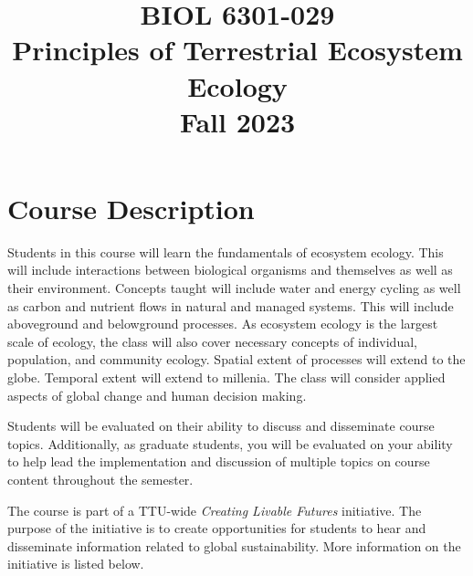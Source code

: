 \documentclass[12pt, notitlepage]{article}   	%
\title{
	\textbf{
		BIOL 6301-029
	} \\
	\large Principles of Terrestrial Ecosystem Ecology \\
	\large Fall 2023
}
\date{\vspace{-5ex}}
\begin{document}
{\selectfont %

\maketitle

\section{Course Description}
Students in this course will learn the fundamentals of ecosystem ecology.
This will include interactions between biological organisms and themselves as well as
their environment. Concepts taught will include water and energy cycling as well as carbon
and nutrient flows in natural and managed systems.
This will include aboveground and belowground processes.
As ecosystem ecology is the largest scale of ecology, the class will also cover necessary
concepts of individual, population, and community ecology.
Spatial extent of processes will extend to the globe. Temporal extent will extend to 
millenia. The class will consider applied aspects of global change and human decision making.

Students will be evaluated on their 
ability to discuss and disseminate course topics.
Additionally, as graduate students, you will be evaluated on your ability to help lead
the implementation and discussion of multiple
topics on course content throughout the semester.

The course is part of a TTU-wide \textit{Creating Livable Futures} initiative.
The purpose of the initiative is to create opportunities for students to hear and
disseminate information related to global sustainability. More information on the
initiative is listed below.

}
\end{document}
